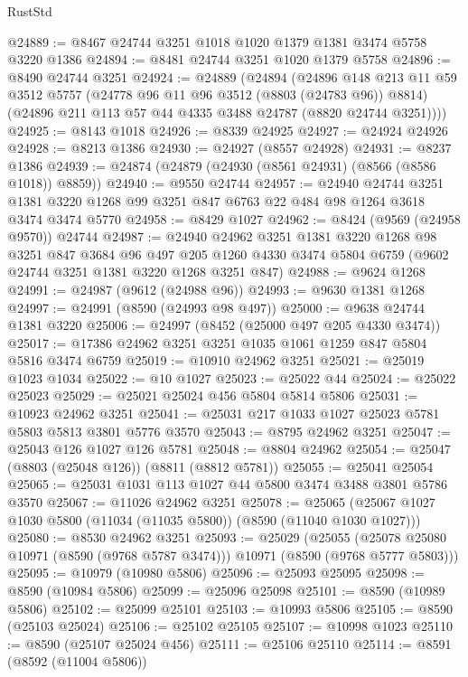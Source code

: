\begin{lexlean}{RustStd}
\begin{coremodule}
@24889 := @8467 @24744 @3251 @1018 @1020 @1379 @1381 @3474 @5758 @3220 @1386
@24894 := @8481 @24744 @3251 @1020 @1379 @5758
@24896 := @8490 @24744 @3251
@24924 := @24889
    (@24894
      (@24896
        @148
        @213
        @11
        @59
        @3512
        @5757
        (@24778 @96 @11 @96 @3512 (@8803 (@24783 @96)) @8814)
        (@24896 @211 @113 @57 @44 @4335 @3488 @24787 (@8820 @24744 @3251))))
@24925 := @8143 @1018
@24926 := @8339 @24925
@24927 := @24924 @24926
@24928 := @8213 @1386
@24930 := @24927 (@8557 @24928)
@24931 := @8237 @1386
@24939 := @24874 (@24879 (@24930 (@8561 @24931) (@8566 (@8586 @1018)) @8859))
@24940 := @9550 @24744
@24957 := @24940
    @24744
    @3251
    @1381
    @3220
    @1268
    @99
    @3251
    @847
    @6763
    @22
    @484
    @98
    @1264
    @3618
    @3474
    @3474
    @5770
@24958 := @8429 @1027
@24962 := @8424 (@9569 (@24958 @9570)) @24744
@24987 := @24940
    @24962
    @3251
    @1381
    @3220
    @1268
    @98
    @3251
    @847
    @3684
    @96
    @497
    @205
    @1260
    @4330
    @3474
    @5804
    @6759
    (@9602 @24744 @3251 @1381 @3220 @1268 @3251 @847)
@24988 := @9624 @1268
@24991 := @24987 (@9612 (@24988 @96))
@24993 := @9630 @1381 @1268
@24997 := @24991 (@8590 (@24993 @98 @497))
@25000 := @9638 @24744 @1381 @3220
@25006 := @24997 (@8452 (@25000 @497 @205 @4330 @3474))
@25017 := @17386 @24962 @3251 @3251 @1035 @1061 @1259 @847 @5804 @5816 @3474 @6759
@25019 := @10910 @24962 @3251
@25021 := @25019 @1023 @1034
@25022 := @10 @1027
@25023 := @25022 @44
@25024 := @25022 @25023
@25029 := @25021 @25024 @456 @5804 @5814 @5806
@25031 := @10923 @24962 @3251
@25041 := @25031 @217 @1033 @1027 @25023 @5781 @5803 @5813 @3801 @5776 @3570
@25043 := @8795 @24962 @3251
@25047 := @25043 @126 @1027 @126 @5781
@25048 := @8804 @24962
@25054 := @25047 (@8803 (@25048 @126)) (@8811 (@8812 @5781))
@25055 := @25041 @25054
@25065 := @25031 @1031 @113 @1027 @44 @5800 @3474 @3488 @3801 @5786 @3570
@25067 := @11026 @24962 @3251
@25078 := @25065 (@25067 @1027 @1030 @5800 (@11034 (@11035 @5800)) (@8590 (@11040 @1030 @1027)))
@25080 := @8530 @24962 @3251
@25093 := @25029
    (@25055 (@25078 @25080 @10971 (@8590 (@9768 @5787 @3474))) @10971 (@8590 (@9768 @5777 @5803)))
@25095 := @10979 (@10980 @5806)
@25096 := @25093 @25095
@25098 := @8590 (@10984 @5806)
@25099 := @25096 @25098
@25101 := @8590 (@10989 @5806)
@25102 := @25099 @25101
@25103 := @10993 @5806
@25105 := @8590 (@25103 @25024)
@25106 := @25102 @25105
@25107 := @10998 @1023
@25110 := @8590 (@25107 @25024 @456)
@25111 := @25106 @25110
@25114 := @8591 (@8592 (@11004 @5806))

\end{coremodule}
\end{lexlean}
